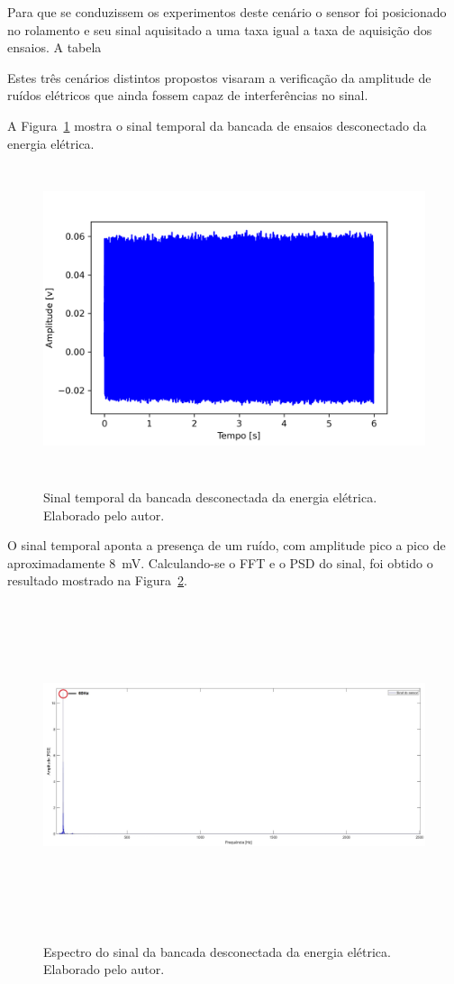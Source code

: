 \documentclass[
	12pt,				
	oneside,			
	a4paper,			
	english,			
	brazil,			
	]{abntex2ppgsi}
\begin{document}
Para que se conduzissem os experimentos deste cenário o sensor foi posicionado no rolamento e seu sinal aquisitado a uma taxa igual a taxa de aquisição dos ensaios. A tabela 

Estes três cenários distintos propostos visaram a verificação da amplitude de ruídos elétricos que ainda fossem capaz de interferências no sinal. 

A Figura~\ref{maquina_desligada_da_tomada} mostra o sinal temporal da bancada de ensaios desconectado da energia elétrica. 

\begin{figure}[H]
\centering
\caption {Sinal temporal da bancada desconectada da energia elétrica. Elaborado pelo autor.}
\includegraphics[width=\textwidth,height=90mm,keepaspectratio]{Caso0/maquina_desligada_da_tomada}
\label{maquina_desligada_da_tomada}
\end{figure} 

O sinal temporal aponta a presença de um ruído, com amplitude pico a pico de aproximadamente {\SI{8}{\milli\volt}}. Calculando-se o FFT e o PSD do sinal, foi obtido o resultado mostrado na Figura~\ref{PSD_SENSOR_MAQUINA_DESLIGADA}. 

\begin{figure}[H]
\caption {Espectro do sinal da bancada desconectada da energia elétrica. Elaborado pelo autor.}
\includegraphics[height=95mm,keepaspectratio]{Caso0/PSD_SENSOR_MAQUINA_DESLIGADA}
\label{PSD_SENSOR_MAQUINA_DESLIGADA}
\end{figure} 
\end{document}
